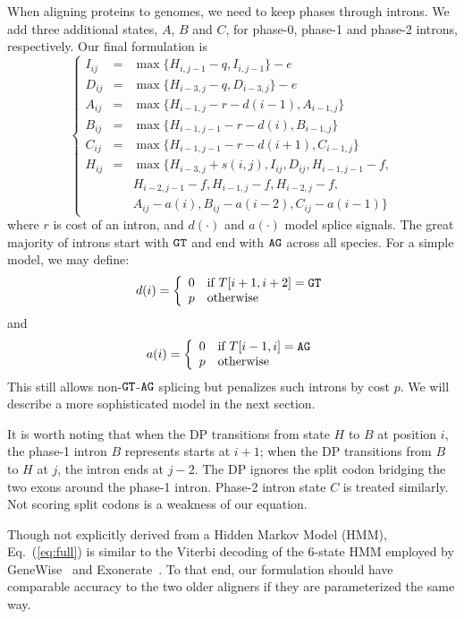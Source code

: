 \documentclass{bioinfo}
\begin{document}
\begin{methods}
When aligning proteins to genomes, we need to keep phases through introns. We
add three additional states, $A$, $B$ and $C$, for phase-0, phase-1 and phase-2
introns, respectively.  Our final formulation is
\begin{equation}\label{eq:full}
\left\{\begin{array}{lll}
I_{ij}&=&\max\{ H_{i,j-1} - q, I_{i,j-1} \} - e \\
D_{ij}&=&\max\{ H_{i-3,j} - q, D_{i-3,j} \} - e \\
A_{ij}&=&\max\{ H_{i-1,j} - r - d(i-1), A_{i-1,j} \} \\
B_{ij}&=&\max\{ H_{i-1,j-1} - r - d(i), B_{i-1,j} \} \\
C_{ij}&=&\max\{ H_{i-1,j-1} - r - d(i+1), C_{i-1,j} \} \\
H_{ij}&=&\max\{ H_{i-3,j}+s(i,j), I_{ij}, D_{ij}, H_{i-1,j-1}-f, \\
       && H_{i-2,j-1}-f, H_{i-1,j}-f, H_{i-2,j}-f, \\
	   && A_{ij}-a(i), B_{ij}-a(i-2), C_{ij}-a(i-1) \}
\end{array}\right.
\end{equation}
where $r$ is cost of an intron, and $d(\cdot)$ and $a(\cdot)$ model splice
signals. The great majority of introns start with ${\tt GT}$ and end with ${\tt
AG}$ across all species. For a simple model, we may define:
$$
d(i)=\left\{\begin{array}{ll}
0 & \mbox{if $T[i+1,i+2]={\tt GT}$}\\
p & \mbox{otherwise}\\
\end{array}\right.
$$
and
$$
a(i)=\left\{\begin{array}{ll}
0 & \mbox{if $T[i-1,i]={\tt AG}$}\\
p & \mbox{otherwise}\\
\end{array}\right.
$$
This still allows non-${\tt GT}$-${\tt AG}$ splicing but penalizes such introns
by cost $p$. We will describe a more sophisticated model in the next section.

It is worth noting that when the DP transitions from state $H$ to $B$ at
position $i$, the phase-1 intron $B$ represents starts at $i+1$; when the DP
transitions from $B$ to $H$ at $j$, the intron ends at $j-2$. The DP ignores
the split codon bridging the two exons around the phase-1 intron. Phase-2
intron state $C$ is treated similarly. Not scoring split codons is a weakness
of our equation.

Though not explicitly derived from a Hidden Markov Model (HMM),
Eq.~(\ref{eq:full}) is similar to the Viterbi decoding of the 6-state HMM
employed by GeneWise~\citep{Birney:2004uy} and Exonerate~\citep{Slater:2005aa}.
To that end,  our formulation should have comparable accuracy to the two older
aligners if they are parameterized the same way.


\end{methods}
\end{document}

